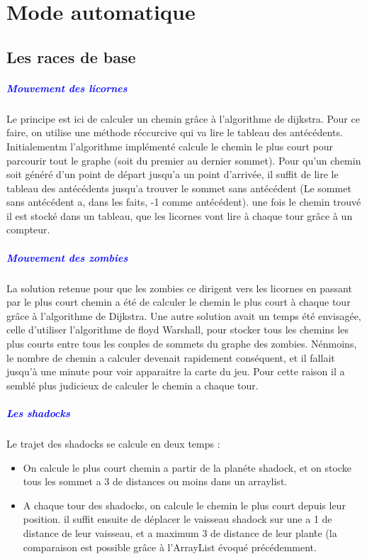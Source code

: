 \documentclass{report}
\begin{document}
			
			
	\chapter*{Mode automatique}
		\section{Les races de base}
			\paragraph{\textcolor{blue}{Mouvement des licornes}}
			Le principe est ici de calculer un chemin gr\^ace \`a l'algorithme de dijkstra. Pour ce faire, on utilise une m\'ethode r\'eccurcive qui va lire le tableau des ant\'ec\'edents. Initialementm l'algorithme impl\'ement\'e calcule le chemin le plus court pour parcourir tout le graphe (soit du premier au dernier sommet). Pour qu'un chemin soit g\'en\'er\'e d'un point de d\'epart jusqu'a un point d'arriv\'ee, il suffit de lire le tableau des ant\'ec\'edents jusqu'a trouver le sommet sans ant\'ec\'edent (Le sommet sans ant\'ec\'edent a, dans les faits, -1 comme ant\'ec\'edent). une fois le chemin trouv\'e il est stock\'e dans un tableau, que les licornes vont lire \`a chaque tour gr\^ace \`a un compteur.
			\paragraph{\textcolor{blue}{Mouvement des zombies}}
			La solution retenue pour que les zombies ce dirigent vers les licornes en passant par le plus court chemin a \'et\'e de calculer le chemin le plus court \`a chaque tour gr\^ace \`a l'algorithme de Dijkstra. Une autre solution avait un temps \'et\'e envisag\'ee, celle d'utiliser l'algorithme de floyd Warshall, pour stocker tous les chemins les plus courts entre tous les couples de sommets du graphe des zombies. N\'enmoins, le nombre de chemin a calculer devenait rapidement cons\'equent, et il fallait jusqu'\`a une minute pour voir apparaitre la carte du jeu. Pour cette raison il a sembl\'e plus judicieux de calculer le chemin a chaque tour.
			\paragraph{\textcolor{blue}{Les shadocks}}
			Le trajet des shadocks se calcule en deux temps :
				
			\begin{itemize}
				\item On calcule le plus court chemin a partir de la plan\'ete shadock, et on stocke tous les sommet a 3 de distances ou moins dans un arraylist.
				\item A chaque tour des shadocks, on calcule le chemin le plus court depuis leur position. il suffit ensuite de d\'eplacer le vaisseau shadock sur une a 1 de distance de leur vaisseau, et a maximum 3 de distance de leur plan\`te (la comparaison est possible gr\^ace \`a l'ArrayList \'evoqu\'e pr\'ec\'edemment.
			\end{itemize}
\end{document}
